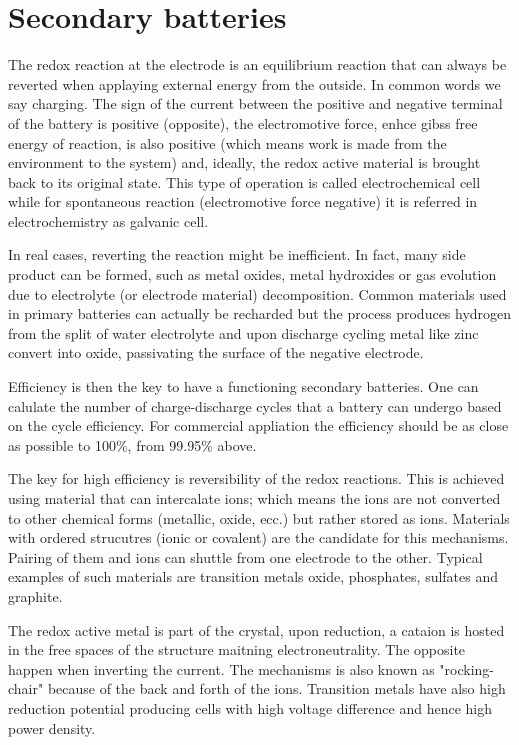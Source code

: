 \section{Secondary batteries}

The redox reaction at the electrode is an equilibrium reaction that can always be reverted when applaying external energy from the outside. In common words we say charging. The sign of the current between the positive and negative terminal of the battery is positive (opposite), the electromotive force, enhce gibss free energy of reaction, is also positive (which means work is made from the environment to the system) and, ideally, the redox active material is brought back to its original state. This type of operation is called electrochemical cell while for spontaneous reaction (electromotive force negative) it is referred in electrochemistry as galvanic cell.

In real cases, reverting the reaction might be inefficient. In fact, many side product can be formed, such as metal oxides, metal hydroxides or gas evolution due to electrolyte (or electrode material) decomposition. Common materials used in primary batteries can actually be recharded but the process produces hydrogen from the split of water electrolyte and upon discharge cycling metal like zinc convert into oxide, passivating the surface of the negative electrode.

Efficiency is then the key to have a functioning secondary batteries. One can calulate the number of charge-discharge cycles that a battery can undergo based on the cycle efficiency. For commercial appliation the efficiency should be as close as possible to 100\%, from 99.95\% above.

The key for high efficiency is reversibility of the redox reactions. This is achieved using material that can intercalate ions; which means the ions are not converted to other chemical forms (metallic, oxide, ecc.) but rather stored as ions. Materials with ordered strucutres (ionic or covalent) are the candidate for this mechanisms. Pairing of them and ions can shuttle from one electrode to the other. Typical examples of such materials are transition metals oxide, phosphates, sulfates and graphite.

The redox active metal is part of the crystal, upon reduction, a cataion is hosted in the free spaces of the structure maitning electroneutrality. The opposite happen when inverting the current. The mechanisms is also known as "rocking-chair" because of the back and forth of the ions. Transition metals have also high reduction potential producing cells with high voltage difference and hence high power density.

